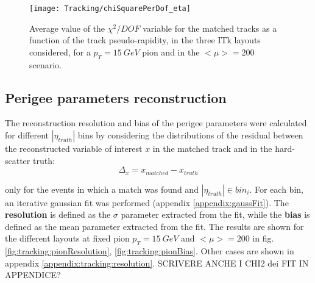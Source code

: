 \documentclass[a4paper,twoside,12pt]{article}
\begin{document}
\begin{figure}
\centering
\texttt{[image: Tracking/chiSquarePerDof\_eta]}
\caption{Average value of the $\chi^{2}/DOF$ variable for the matched tracks as a function of the track pseudo-rapidity, in the three ITk layouts considered, for a $p_{T} = 15\ GeV$ pion
and in the $<\mu> = 200$ scenario.}
\label{fig:tracking:chiSqPerDof_eta}
\end{figure}

\subsection{Perigee parameters reconstruction}\label{sec:tracking:resolution}
The reconstruction resolution and bias of the perigee parameters were calculated for different $|\eta_{truth}|$ bins by considering the distributions of the residual between the reconstructed
variable of interest $x$ in the matched track and in the hard-scatter truth:\\
$$
\Delta_{x} = x_{matched} - x_{truth}
$$

only for the events in which a match was found and $|\eta_{truth}| \in bin_{i}$. For each bin, an iterative gaussian fit was performed (appendix \ref{appendix:gaussFit}). The \textbf{resolution}
is defined as the $\sigma$ parameter extracted from the fit, while the \textbf{bias} is defined as the mean parameter extracted from the fit. The results are shown for the different layouts at
fixed pion $p_{T} = 15\ GeV$ and $<\mu> = 200$ in fig.\ref{fig:tracking:pionResolution}, \ref{fig:tracking:pionBias}. Other cases are shown in appendix \ref{appendix:tracking:resolution}. SCRIVERE ANCHE I CHI2 dei FIT IN APPENDICE?\\
\end{document}
